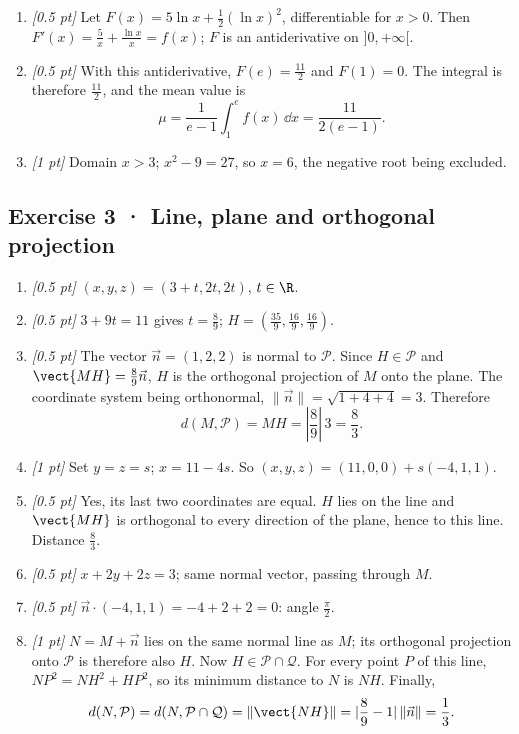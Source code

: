 \begin{enumerate}
\item \textit{[0.5 pt]} Let $F(x)=5\ln x+\frac12(\ln x)^2$, differentiable for $x>0$. Then $F'(x)=\frac{5}{x}+\frac{\ln x}{x}=f(x)$; $F$ is an antiderivative on $]0,+\infty[$.

\item \textit{[0.5 pt]} With this antiderivative, $F(e)=\frac{11}{2}$ and $F(1)=0$. The integral is therefore $\frac{11}{2}$, and the mean value is
\[\mu=\frac{1}{e-1}\int_1^e f(x)\,\dd x=\frac{11}{2(e-1)}.\]

\item \textit{[1 pt]} Domain $x>3$; $x^2-9=27$, so $x=6$, the negative root being excluded.

\end{enumerate}

\subsection*{Exercise 3 · Line, plane and orthogonal projection}\begin{enumerate}

\item \textit{[0.5 pt]} $(x,y,z)=(3+t,2t,2t)$, $t\in\R$.

\item \textit{[0.5 pt]} $3+9t=11$ gives $t=\frac{8}{9}$; $H=(\frac{35}{9},\frac{16}{9},\frac{16}{9})$.

\item \textit{[0.5 pt]} The vector $\vec n=(1,2,2)$ is normal to $\mathcal P$. Since $H\in\mathcal P$ and $\vect{MH}=\frac{8}{9}\vec n$, $H$ is the orthogonal projection of $M$ onto the plane. The coordinate system being orthonormal, $\|\vec n\|=\sqrt{1+4+4}=3$. Therefore
\[d(M,\mathcal P)=MH=|\frac{8}{9}|\,3=\frac{8}{3}.\]

\item \textit{[1 pt]} Set $y=z=s$; $x=11-4s$. So $(x,y,z)=(11,0,0)+s(-4,1,1)$.

\item \textit{[0.5 pt]} Yes, its last two coordinates are equal. $H$ lies on the line and $\vect{MH}$ is orthogonal to every direction of the plane, hence to this line. Distance $\frac{8}{3}$.

\item \textit{[0.5 pt]} $x+2y+2z=3$; same normal vector, passing through $M$.

\item \textit{[0.5 pt]} $\vec n\cdot(-4,1,1)=-4+2+2=0$: angle $\frac{\pi}{2}$.

\item \textit{[1 pt]} $N=M+\vec n$ lies on the same normal line as $M$; its orthogonal projection onto $\mathcal P$ is therefore also $H$. Now $H\in\mathcal P\cap\mathcal Q$. For every point $P$ of this line, $NP^2=NH^2+HP^2$, so its minimum distance to $N$ is $NH$. Finally,
\[d(N,\mathcal P)=d(N,\mathcal P\cap\mathcal Q)=\|\vect{NH}\|=|\frac{8}{9}-1|\,\|\vec n\|=\frac{1}{3}.\]

\end{enumerate}

